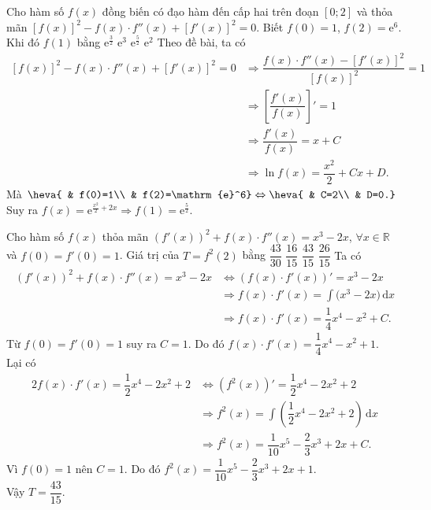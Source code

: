 \begin{ex}%
	Cho hàm số $ f(x)$ đồng biến có đạo hàm đến cấp hai trên đoạn $\left[0;2\right]$ và thỏa mãn $\left[f(x)\right]^2-f(x)\cdot f''(x)+\left[f'(x)\right]^2=0$. Biết $ f(0)=1$, $ f(2)={\mathrm{e}}^6$. Khi đó $ f(1)$ bằng
	\choice
	{$\mathrm{e}^{\tfrac{3}{2}}$}
	{$\mathrm{e}^3$}
	{\True $\mathrm{e}^{\tfrac{5}{2}}$}
	{$\mathrm{e}^2$}
	\loigiai
	{
	Theo đề bài, ta có
	\begin{align*}
		\left[f(x)\right]^2-f(x)\cdot f''(x)+\left[f'(x)\right]^2=0
		 & \Rightarrow\dfrac{f(x)\cdot f''(x)-\left[f'(x)\right]^2}{\left[f(x)\right]^2}=1 \\
		 & \Rightarrow{\left[\dfrac{f'(x)}{f(x)}\right]'}=1                                \\& \Rightarrow\dfrac{f'(x)}{f(x)}=x+C\\
		 & \Rightarrow\ln f(x)=\dfrac{x^2}{2}+Cx+D.
	\end{align*}
	Mà $\heva{
			& f(0)=1\\
			& f(2)=\mathrm{e}^6} \Leftrightarrow\heva{
			& C=2\\
			& D=0.}$\\
	Suy ra $f(x)=\mathrm{e}^{\tfrac{x^2}{2}+2x}\Rightarrow f(1)=\mathrm{e}^{\tfrac{5}{2}}$.}
\end{ex}
\begin{ex}%
	Cho hàm số $ f(x)$ thỏa mãn $(f'(x))^2+f(x)\cdot f''(x)=x^3-2x$, $\forall x\in\mathbb{R}$ và \break $ f(0)=f'(0)=1$. Giá trị của $ T=f^2(2)$ bằng
	\choice
	{$\dfrac{43}{30}$}
	{$\dfrac{16}{15}$}
	{\True $\dfrac{43}{15}$}
	{$\dfrac{26}{15}$}
	\loigiai
	{
		Ta có
		\begin{align*}
			\left( f'(x)\right)^2+f(x)\cdot f''(x)=x^3-2x & \Leftrightarrow \left( f(x)\cdot f'(x)\right)'=x^3-2x \\& \Rightarrow f(x)\cdot f'(x)=\displaystyle\int{(x^3-2x})\mathrm{\,d} x\\&\Rightarrow f(x)\cdot f'(x)=\dfrac{1}{4}{x^4}-x^2+C.
		\end{align*}
		Từ $ f(0)=f'(0)=1$ suy ra $C=1$. Do đó $ f(x)\cdot f'(x)=\dfrac{1}{4}{x^4}-x^2+1$.\\
		Lại có
		\begin{align*}
			2f(x)\cdot f'(x)=\dfrac{1}{2}{x^4}-2x^2+2 & \Leftrightarrow \left( f^2(x)\right) '=\dfrac{1}{2}{x^4}-2x^2+2 \\& \Rightarrow{f^2}(x)=\displaystyle\int{\left(\dfrac{1}{2}{x^4}-2x^2+2\right)}\mathrm{\,d} x\\& \Rightarrow{f^2}(x)=\dfrac{1}{10}{x^5}-\dfrac{2}{3}{x^3}+2x+C.
		\end{align*}
		Vì $ f(0)=1$ nên $C=1$. Do đó $f^2(x)=\dfrac{1}{10}{x^5}-\dfrac{2}{3}{x^3}+2x+1$.\\
		Vậy $T=\dfrac{43}{15}$.}
\end{ex}

